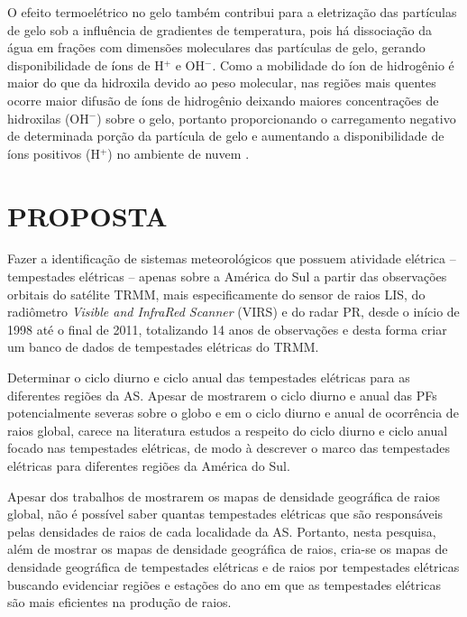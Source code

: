 O efeito termoelétrico no gelo também contribui para a eletrização das partículas de gelo sob a influência de gradientes de temperatura, pois há dissociação da água em frações com dimensões moleculares das partículas de gelo, gerando disponibilidade de íons de H$^{+}$ e OH$^{-}$. Como a mobilidade do íon de hidrogênio é maior do que da hidroxila devido ao peso molecular, nas regiões mais quentes ocorre maior difusão de íons de hidrogênio deixando maiores concentrações de hidroxilas (OH$^{-}$) sobre o gelo, portanto proporcionando o carregamento negativo de determinada porção da partícula de gelo e aumentando a disponibilidade de íons positivos (H$^{+}$) no ambiente de nuvem \cite{latham1961}.  

\section{PROPOSTA}

Fazer a identificação de sistemas meteorológicos que possuem atividade elétrica -- tempestades elétricas -- apenas sobre a América do Sul a partir das observações orbitais do satélite TRMM, mais especificamente do sensor de raios LIS, do radiômetro \textit{Visible and InfraRed Scanner} (VIRS) e do radar PR, desde o início de 1998 até o final de 2011, totalizando 14 anos de observações e desta forma criar um banco de dados de tempestades elétricas do TRMM.

Determinar o ciclo diurno e ciclo anual das tempestades elétricas para as diferentes regiões da AS. Apesar de  mostrarem o ciclo diurno e anual das PFs potencialmente severas sobre o globo e em  o ciclo diurno e anual de ocorrência de raios global, carece na literatura estudos a respeito do ciclo diurno e ciclo anual focado nas tempestades elétricas, de modo à descrever o marco das tempestades elétricas para diferentes regiões da América do Sul.

Apesar dos trabalhos de  mostrarem os mapas de densidade geográfica de raios global, não é possível saber quantas tempestades elétricas que são responsáveis pelas densidades de raios de cada localidade da AS. Portanto, nesta pesquisa, além de mostrar os mapas de densidade geográfica de raios, cria-se os mapas de densidade geográfica de tempestades elétricas e de raios por tempestades elétricas buscando evidenciar regiões e estações do ano em que as tempestades elétricas são mais eficientes na produção de raios.

